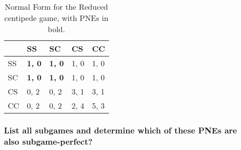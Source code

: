 \begin{table}[h!]
  \centering
  \begin{tabular}{|l|l|l|l|l|}
    \hline
           &   SS  &  SC   &   CS  &   CC \\ \hline
       SS  & \textbf{1, 0} & \textbf{1, 0} & 1, 0 & 1, 0 \\ \hline
       SC  & \textbf{1, 0} & \textbf{1, 0} & 1, 0 & 1, 0 \\ \hline
       CS  & 0, 2 & 0, 2 & 3, 1 & 3, 1 \\ \hline
       CC  & 0, 2 & 0, 2 & 2, 4 & 5, 3 \\ \hline
  \end{tabular}
  \caption{Normal Form for the Reduced centipede game, with PNEs in bold.}
  \label{your-table-label}
\end{table}



\subsubsection{List all subgames and determine which of these PNEs are also subgame-perfect?}